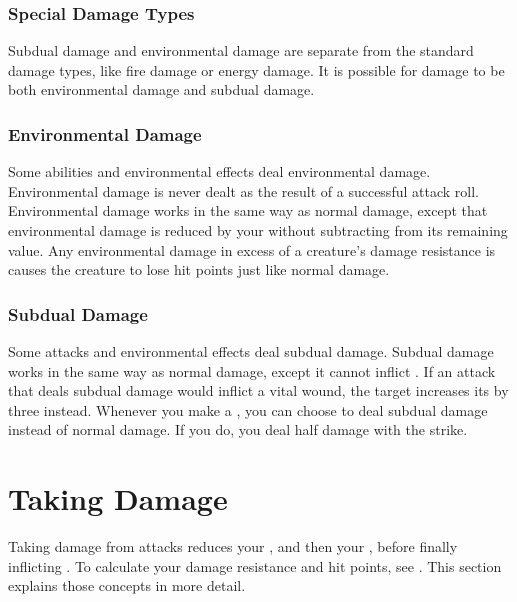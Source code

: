     \subsubsection{Special Damage Types}\label{Special Damage Types}

        Subdual damage and environmental damage are separate from the standard damage types, like fire damage or energy damage.
        It is possible for damage to be both environmental damage and subdual damage.

        \subsubsection{Environmental Damage}\label{Environmental Damage}
            Some abilities and environmental effects deal environmental damage.
            Environmental damage is never dealt as the result of a successful attack roll.
            Environmental damage works in the same way as normal damage, except that environmental damage is reduced by your  without subtracting from its remaining value.
            Any environmental damage in excess of a creature's damage resistance is causes the creature to lose hit points just like normal damage.

        \subsubsection{Subdual Damage}\label{Subdual Damage}
            Some attacks and environmental effects deal subdual damage.
            Subdual damage works in the same way as normal damage, except it cannot inflict .
            If an attack that deals subdual damage would inflict a vital wound, the target increases its  by three instead.
            Whenever you make a , you can choose to deal subdual damage instead of normal damage.
            If you do, you deal half damage with the strike.

\section{Taking Damage}\label{Taking Damage}
    Taking damage from attacks reduces your , and then your , before finally inflicting .
    To calculate your damage resistance and hit points, see .
    This section explains those concepts in more detail.

